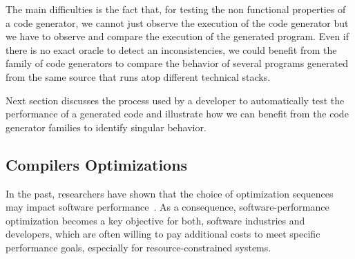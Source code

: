 The main difficulties is the fact that, for testing the non functional properties of a code generator, we cannot just observe the execution of the code generator but we have to observe and compare the execution of the generated program. Even if there is no exact oracle to detect an inconsistencies, we could benefit from the family of code generators to compare the behavior of several programs generated from the same source that runs atop different technical stacks. 

Next section discusses the process used by a developer to automatically test the performance of a generated code and illustrate how we can benefit from the code generator families to identify singular behavior. 





 




\iffalse 
//footprint
//It is also possible to automatically generate test suites for software artfacts 
//model coverage
//System resources and architecture of each execution platform might vary 
//talk about platform specific profilers
//heterogeneous execution platforms
//the need of system level abstraction/virtualization to handle heterogeneity
//ease the monitoring process 
//add figure of SOTA 
\fi




 
\iffalse 
\subsection{Compilers Optimizations}
In the past, researchers have shown that the choice of optimization sequences may impact software performance~\cite{almagor2004finding,chen2012deconstructing}. 
As a consequence, software-performance optimization becomes a key objective for both, software industries and developers, which are often willing to pay additional costs to meet specific performance goals, especially for resource-constrained systems.

